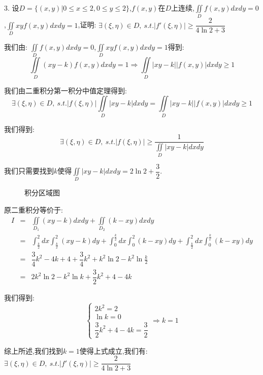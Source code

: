 3. 设$D=\{(x,y)|0\leq x\leq 2,0\leq y\leq 2\}$,$f(x,y)$在$D$上连续,$\iint\limits_{D}f(x,y)dxdy=0$,$\iint\limits_{D}xyf(x,y)dxdy=1$,证明: $\exists (\xi,\eta)\in D,\ s.t. |f'(\xi,\eta)|\geq \dfrac{2}{4\ln 2+3}$
\begin{solution}
	
	我们由: $\iint\limits_{D}f(x,y)dxdy=0$,$\iint\limits_{D}xyf(x,y)dxdy=1$得到: 
	$$\iint\limits_{D}(xy-k)f(x,y)dxdy=1\Rightarrow \iint\limits_{D}|xy-k||f(x,y)|dxdy\geq 1$$
	
	我们由二重积分第一积分中值定理得到: 
	$$\exists (\xi,\eta)\in D, \ s.t. |f(\xi,\eta)|\iint\limits_{D}|xy-k|dxdy=\iint\limits_{D}|xy-k||f(x,y)|dxdy\geq 1$$
	
	我们得到: 
	$$\exists (\xi,\eta)\in D, \ s.t. |f(\xi,\eta)|\geq \dfrac{1}{\iint\limits_{D}|xy-k|dxdy}$$
	
	我们只需要找到$k$使得$\iint\limits_{D}|xy-k|dxdy=2\ln2+\dfrac{3}{2}$.
	\begin{figure}[htbp]
		\centering
		\caption{积分区域图}
		\label{积分区域图}
	\end{figure} 
	
	原二重积分等价于: 
	\begin{eqnarray*}
		I&=&\iint\limits_{D_{1}}(xy-k)dxdy+\iint\limits_{D_{2}}(k-xy)dxdy\\
		&=&\int_{\frac{k}{2}}^{2}dx\int_{\frac{k}{x}}^{2}(xy-k)dy+\int_{0}^{\frac{k}{2}}dx\int_{0}^{2}(k-xy)dy+\int_{\frac{k}{2}}^{2}dx\int_{0}^{\frac{k}{x}}(k-xy)dy\\
		&=&\dfrac{3}{4}k^2-4k+4+\dfrac{3}{4}k^2+k^2\ln 2-k^2\ln \frac{k}{2}\\
		&=&2k^2\ln 2-k^2\ln k+\dfrac{3}{2}k^2+4-4k
	\end{eqnarray*}
	
	我们得到: 
	$$\left\lbrace
	\begin{array}{l}
		2k^2=2\\
		\ln k=0\\
		\dfrac{3}{2}k^2+4-4k=\dfrac{3}{2}
	\end{array}
	\right. \Rightarrow k=1$$
	
	综上所述,我们找到$k=1$使得上式成立,我们有: $\exists (\xi,\eta)\in D,\ s.t. |f'(\xi,\eta)|\geq \dfrac{2}{4\ln 2+3}$
\end{solution}

